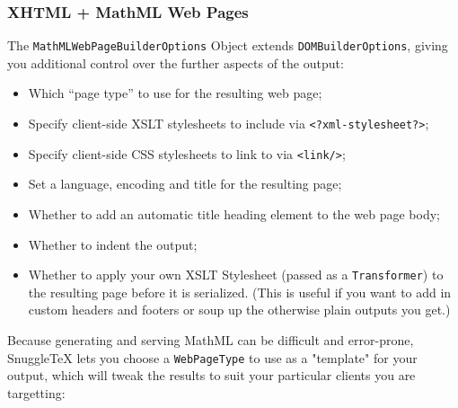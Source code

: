 \subsubsection*{XHTML + MathML Web Pages}

The \verb|MathMLWebPageBuilderOptions| Object extends \verb|DOMBuilderOptions|,
giving you additional control over the further aspects of the output:

\begin{itemize}
  \item Which ``page type'' to use for the resulting web page;
  \item Specify client-side XSLT stylesheets to include via \verb|<?xml-stylesheet?>|;
  \item Specify client-side CSS stylesheets to link to via \verb|<link/>|;
  \item Set a language, encoding and title for the resulting page;
  \item Whether to add an automatic title heading element to the web page body;
  \item Whether to indent the output;
  \item Whether to apply your own XSLT Stylesheet (passed as a \verb|Transformer|) to
    the resulting page before it is serialized. (This is useful if you want to add
    in custom headers and footers or soup up the otherwise plain outputs you get.)
\end{itemize}

Because generating and serving MathML can be difficult and error-prone, SnuggleTeX lets
you choose a \verb|WebPageType| to use as a "template" for your output, which will tweak
the results to suit your particular clients you are targetting:

